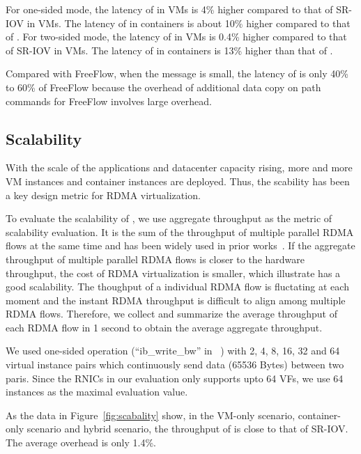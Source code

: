 For one-sided mode, the latency of \sys in VMs is 4\% higher compared to that of SR-IOV in VMs. The latency of \sys in containers is about 10\% higher compared to that of \native. For two-sided mode, the latency of \sys in VMs is 0.4\% higher compared to that of SR-IOV in VMs. The latency of \sys in containers is 13\% higher than that of \native.

Compared with FreeFlow, when the message is small, the latency of \sys is only 40\% to 60\% of FreeFlow because the overhead of additional data copy on path commands for FreeFlow involves large overhead. 





\subsection{Scalability}

With the scale of the applications and datacenter capacity rising, more and more VM instances and container instances are deployed. Thus, the scability has been a key design metric for RDMA virtualization.

To evaluate the scalability of \sys, we use aggregate throughput as the metric of scalability evaluation. It is the sum of the throughput of multiple parallel RDMA flows at the same time and has been widely used in prior works~\cite{kim2019freeflow, pfefferle2015hybrid, he2020masq}. If the aggregate throughput of multiple parallel RDMA flows is closer to the hardware throughput, the cost of RDMA virtualization is smaller, which illustrate \sys has a good scalability. The thoughput of a individual RDMA flow is fluctating at each moment and the instant RDMA throughput is difficult to align among multiple RDMA flows. Therefore, we collect and summarize the average throughput of each RDMA flow in 1 second to obtain the average aggregate throughput.

We used one-sided operation (``ib\_write\_bw'' in ~\cite{perftest}) with 2, 4, 8, 16, 32 and 64 virtual instance pairs which continuously send data (65536 Bytes) between two paris. Since the RNICs in our evaluation only supports upto 64 VFs, we use 64 instances as the maximal evaluation value.

As the data in Figure~\ref{fig:scabality} show, in the VM-only scenario, container-only scenario and hybrid scenario, the throughput of \sys is close to that of SR-IOV. The average overhead is only 1.4\%.


